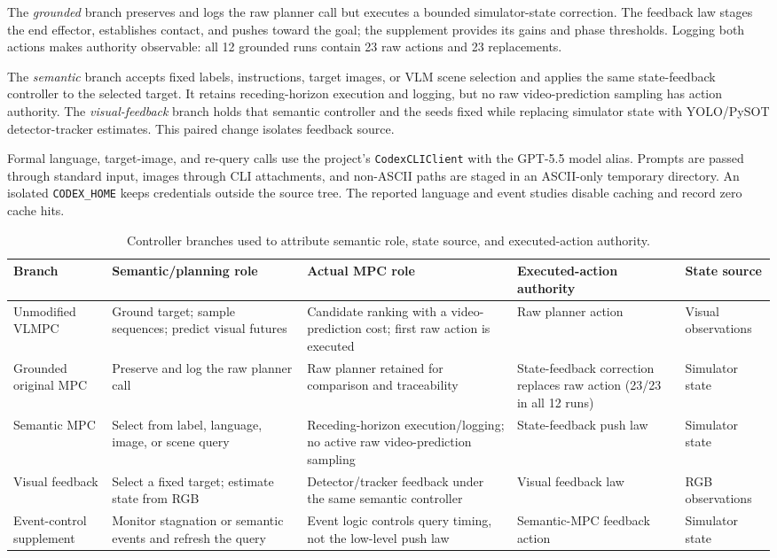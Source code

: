 \documentclass[conference]{IEEEtran}
\begin{document}
The \emph{grounded} branch preserves and logs the raw planner call but executes a bounded simulator-state correction. The feedback law stages the end effector, establishes contact, and pushes toward the goal; the supplement provides its gains and phase thresholds. Logging both actions makes authority observable: all 12 grounded runs contain 23 raw actions and 23 replacements.

The \emph{semantic} branch accepts fixed labels, instructions, target images, or VLM scene selection and applies the same state-feedback controller to the selected target. It retains receding-horizon execution and logging, but no raw video-prediction sampling has action authority. The \emph{visual-feedback} branch holds that semantic controller and the seeds fixed while replacing simulator state with YOLO/PySOT detector-tracker estimates. This paired change isolates feedback source.

Formal language, target-image, and re-query calls use the project's \texttt{CodexCLIClient} with the GPT-5.5 model alias. Prompts are passed through standard input, images through CLI attachments, and non-ASCII paths are staged in an ASCII-only temporary directory. An isolated \texttt{CODEX\_HOME} keeps credentials outside the source tree. The reported language and event studies disable caching and record zero cache hits.

\begin{table}[!t]
\centering
\caption{Controller branches used to attribute semantic role, state source, and executed-action authority.}
\label{tab:branchroles}
\scriptsize
\renewcommand{\arraystretch}{0.90}
\setlength{\tabcolsep}{2pt}
\begin{tabular}{@{}p{}p{}p{}p{}p{}@{}}
\toprule
Branch & Semantic/planning role & Actual MPC role & Executed-action authority & State source \\
\midrule
Unmodified VLMPC & Ground target; sample sequences; predict visual futures & Candidate ranking with a video-prediction cost; first raw action is executed & Raw planner action & Visual observations \\
Grounded original MPC & Preserve and log the raw planner call & Raw planner retained for comparison and traceability & State-feedback correction replaces raw action (23/23 in all 12 runs) & Simulator state \\
Semantic MPC & Select from label, language, image, or scene query & Receding-horizon execution/logging; no active raw video-prediction sampling & State-feedback push law & Simulator state \\
Visual feedback & Select a fixed target; estimate state from RGB & Detector/tracker feedback under the same semantic controller & Visual feedback law & RGB observations \\
Event-control supplement & Monitor stagnation or semantic events and refresh the query & Event logic controls query timing, not the low-level push law & Semantic-MPC feedback action & Simulator state \\
\bottomrule
\end{tabular}
\setlength{\tabcolsep}{6pt}
\renewcommand{\arraystretch}{1.0}
\end{table}
\end{document}
